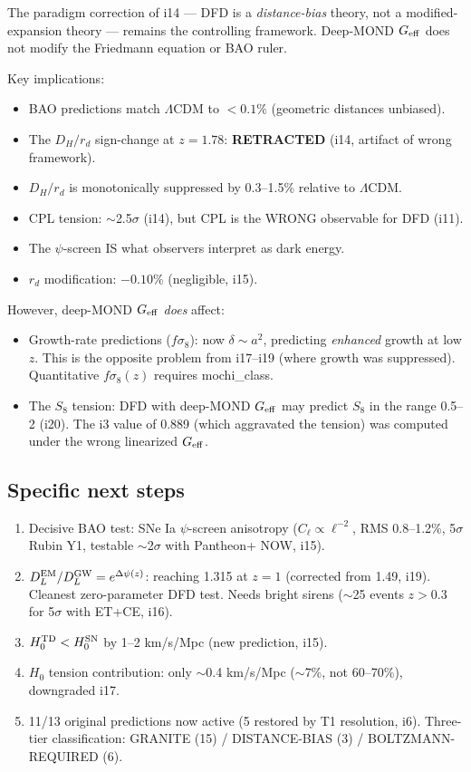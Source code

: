 \documentclass[11pt]{article}
\begin{document}
The paradigm correction of i14 --- DFD is a \emph{distance-bias} theory, not a
modified-expansion theory --- remains the controlling framework. Deep-MOND
$G_{\rm eff}$ does not modify the Friedmann equation or BAO ruler.

Key implications:
\begin{itemize}
\item BAO predictions match $\Lambda$CDM to $<0.1\%$ (geometric distances unbiased).
\item The $D_H/r_d$ sign-change at $z = 1.78$: \textbf{RETRACTED} (i14, artifact of wrong framework).
\item $D_H/r_d$ is monotonically suppressed by 0.3--1.5\% relative to $\Lambda$CDM.
\item CPL tension: $\sim$2.5$\sigma$ (i14), but CPL is the WRONG observable for DFD (i11).
\item The $\psi$-screen IS what observers interpret as dark energy.
\item $r_d$ modification: $-0.10\%$ (negligible, i15).
\end{itemize}

However, deep-MOND $G_{\rm eff}$ \emph{does} affect:
\begin{itemize}
\item Growth-rate predictions ($f\sigma_8$): now $\delta \sim a^2$, predicting
\emph{enhanced} growth at low $z$. This is the opposite problem from i17--i19
(where growth was suppressed). Quantitative $f\sigma_8(z)$ requires mochi\_class.
\item The $S_8$ tension: DFD with deep-MOND $G_{\rm eff}$ may predict $S_8$ in
the range 0.5--2 (i20). The i3 value of 0.889 (which aggravated the tension) was
computed under the wrong linearized $G_{\rm eff}$.
\end{itemize}

\subsection{Specific next steps}
\begin{enumerate}
\item Decisive BAO test: SNe Ia $\psi$-screen anisotropy ($C_\ell \propto \ell^{-2}$,
RMS 0.8--1.2\%, 5$\sigma$ Rubin Y1, testable $\sim$2$\sigma$ with Pantheon+ NOW, i15).
\item $D_L^{\rm EM} / D_L^{\rm GW} = e^{\Delta\psi(z)}$: reaching 1.315 at $z = 1$
(corrected from 1.49, i19). Cleanest zero-parameter DFD test. Needs bright sirens
($\sim$25 events $z > 0.3$ for 5$\sigma$ with ET+CE, i16).
\item $H_0^{\rm TD} < H_0^{\rm SN}$ by 1--2 km/s/Mpc (new prediction, i15).
\item $H_0$ tension contribution: only $\sim$0.4 km/s/Mpc ($\sim$7\%, not 60--70\%),
downgraded i17.
\item 11/13 original predictions now active (5 restored by T1 resolution, i6).
Three-tier classification: GRANITE (15) / DISTANCE-BIAS (3) / BOLTZMANN-REQUIRED (6).
\end{enumerate}
\end{document}
